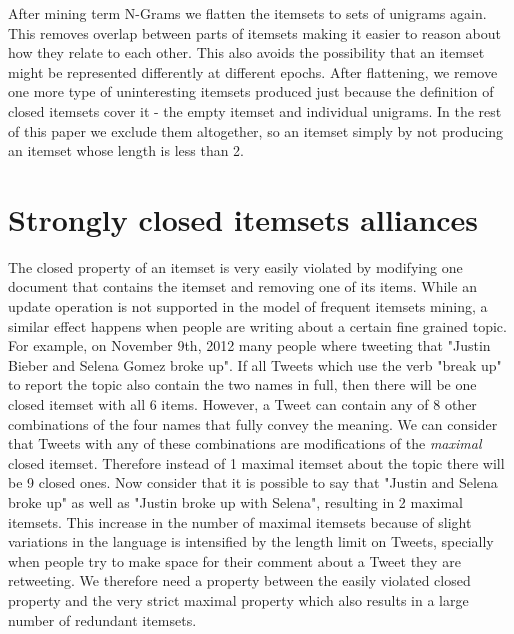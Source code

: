 \documentclass{sig-alternate}
\begin{document}
After mining term N-Grams we flatten the itemsets to sets of unigrams again. This removes overlap between parts of  itemsets making it easier to reason about how they relate to each other. This also avoids the possibility that an itemset might be represented differently at different epochs. After flattening, we remove one more type of uninteresting itemsets produced just because the definition of closed itemsets cover it - the empty itemset and individual unigrams. In the rest of this paper we exclude them altogether, so an itemset  simply by not producing an itemset whose length is less than 2.

\section{Strongly closed itemsets alliances}
The closed property of an itemset is very easily violated by modifying one document that contains the itemset and removing one of its items. While an update operation is not supported in the model of frequent itemsets mining, a similar effect happens when people are writing about a certain fine grained topic. For example, on November 9th, 2012 many people where tweeting that "Justin Bieber and Selena Gomez broke up". If all Tweets which use the verb "break up" to report the topic also contain the two names in full, then there will be one closed itemset with all 6 items. However, a Tweet can contain any of 8 other combinations of the four names that fully convey the meaning. We can consider that Tweets with any of these combinations are modifications of the \emph{maximal} closed itemset. Therefore instead of 1 maximal itemset about the topic there will be 9 closed ones. Now consider that it is possible to say that "Justin and Selena broke up" as well as "Justin broke up with Selena", resulting in 2 maximal itemsets. This increase in the number of maximal itemsets because of slight variations in the language is intensified by the length limit on Tweets, specially when people try to make space for their comment about a Tweet they are retweeting. We therefore need a property between the easily violated closed property and the very strict maximal property which also results in a large number of redundant itemsets. 
\end{document}

